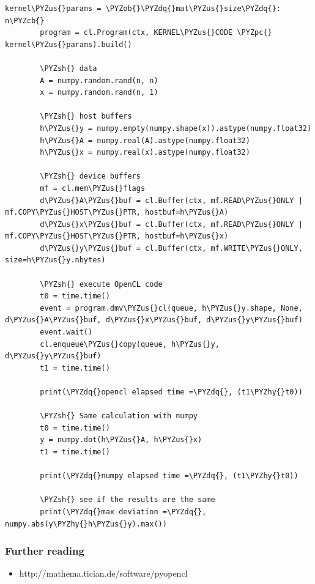 \documentclass{article}
\newenvironment{Shaded}{}{}
\newcommand{\KeywordTok}[1]{\textcolor[rgb]{0.00,0.44,0.13}{\textbf{{#1}}}}
\newcommand{\StringTok}[1]{\textcolor[rgb]{0.25,0.44,0.63}{{#1}}}
\newcommand{\NormalTok}[1]{{#1}}
\def\PYZus{\char`\_}
\def\PYZob{\char`\{}
\def\PYZcb{\char`\}}
\def\PYZsh{\char`\#}
\def\PYZpc{\char`\%}
\def\PYZhy{\char`\-}
\def\PYZdq{\char`\"}
\begin{document}
\begin{Verbatim}[commandchars=\\\{\}]
        kernel\PYZus{}params = \PYZob{}\PYZdq{}mat\PYZus{}size\PYZdq{}: n\PYZcb{}
        program = cl.Program(ctx, KERNEL\PYZus{}CODE \PYZpc{} kernel\PYZus{}params).build()
        
        \PYZsh{} data
        A = numpy.random.rand(n, n)
        x = numpy.random.rand(n, 1)
        
        \PYZsh{} host buffers
        h\PYZus{}y = numpy.empty(numpy.shape(x)).astype(numpy.float32)
        h\PYZus{}A = numpy.real(A).astype(numpy.float32)
        h\PYZus{}x = numpy.real(x).astype(numpy.float32)
        
        \PYZsh{} device buffers
        mf = cl.mem\PYZus{}flags
        d\PYZus{}A\PYZus{}buf = cl.Buffer(ctx, mf.READ\PYZus{}ONLY | mf.COPY\PYZus{}HOST\PYZus{}PTR, hostbuf=h\PYZus{}A)
        d\PYZus{}x\PYZus{}buf = cl.Buffer(ctx, mf.READ\PYZus{}ONLY | mf.COPY\PYZus{}HOST\PYZus{}PTR, hostbuf=h\PYZus{}x)
        d\PYZus{}y\PYZus{}buf = cl.Buffer(ctx, mf.WRITE\PYZus{}ONLY, size=h\PYZus{}y.nbytes)
        
        \PYZsh{} execute OpenCL code
        t0 = time.time()
        event = program.dmv\PYZus{}cl(queue, h\PYZus{}y.shape, None, d\PYZus{}A\PYZus{}buf, d\PYZus{}x\PYZus{}buf, d\PYZus{}y\PYZus{}buf)
        event.wait()
        cl.enqueue\PYZus{}copy(queue, h\PYZus{}y, d\PYZus{}y\PYZus{}buf)
        t1 = time.time()
        
        print(\PYZdq{}opencl elapsed time =\PYZdq{}, (t1\PYZhy{}t0))
        
        \PYZsh{} Same calculation with numpy
        t0 = time.time()
        y = numpy.dot(h\PYZus{}A, h\PYZus{}x)
        t1 = time.time()
        
        print(\PYZdq{}numpy elapsed time =\PYZdq{}, (t1\PYZhy{}t0))
        
        \PYZsh{} see if the results are the same
        print(\PYZdq{}max deviation =\PYZdq{}, numpy.abs(y\PYZhy{}h\PYZus{}y).max())
\end{Verbatim}

    \begin{Shaded}
\end{Shaded}

    \subsubsection{Further reading}\label{further-reading}

    \begin{itemize}
\itemsep1pt\parskip0pt
\item
  http://mathema.tician.de/software/pyopencl
\end{itemize}


    
    
    
    
\end{document}
